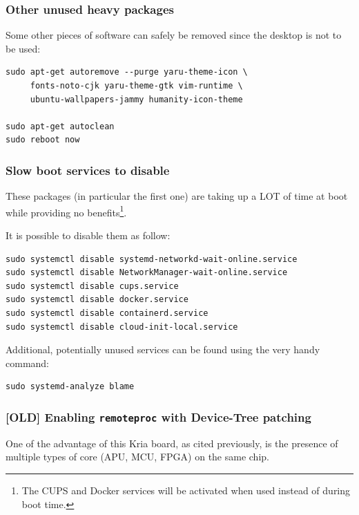 \documentclass[10pt]{article}
\begin{document}
\subsubsection{Other unused heavy packages}
\label{sec:org1d7555d}
Some other pieces of software can safely be removed since the desktop is
not to be used:

\begin{verbatim}
sudo apt-get autoremove --purge yaru-theme-icon \
     fonts-noto-cjk yaru-theme-gtk vim-runtime \
     ubuntu-wallpapers-jammy humanity-icon-theme

sudo apt-get autoclean
sudo reboot now
\end{verbatim}

\subsubsection{Slow boot services to disable}
\label{sec:orge10dbc8}
These packages (in particular the first one) are taking up a LOT of time at boot while providing no benefits\footnote{The CUPS and Docker services will be activated when used instead of during boot time.}.

It is possible to disable them as follow:
\begin{verbatim}
sudo systemctl disable systemd-networkd-wait-online.service
sudo systemctl disable NetworkManager-wait-online.service
sudo systemctl disable cups.service
sudo systemctl disable docker.service
sudo systemctl disable containerd.service
sudo systemctl disable cloud-init-local.service
\end{verbatim}

Additional, potentially unused services can be found using the very handy command:
\begin{verbatim}
sudo systemd-analyze blame
\end{verbatim}

\subsubsection{[OLD] Enabling \texttt{remoteproc} with Device-Tree patching}
\label{sec:org6c82dff}
One of the advantage of this Kria board, as cited previously, is the presence of
multiple types of core (APU, MCU, FPGA) on the same chip.
\end{document}
